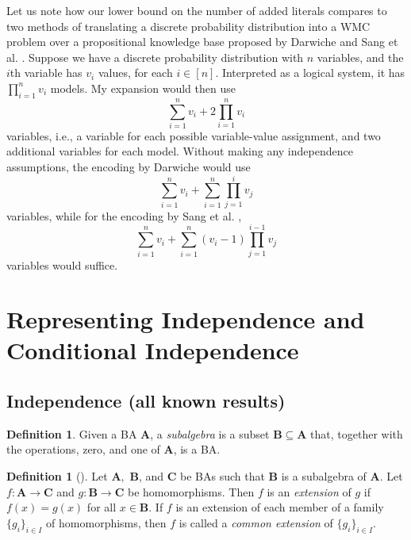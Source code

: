 \documentclass{article}
\theoremstyle{definition}
\newtheorem{definition}[theorem]{Definition}
\theoremstyle{remark}
\begin{document}

Let us note how our lower bound on the number of added literals compares to two
methods of translating a discrete probability distribution into a WMC problem
over a propositional knowledge base proposed by Darwiche
\cite{DBLP:conf/kr/Darwiche02} and Sang et al. \cite{DBLP:conf/aaai/SangBK05}.
Suppose we have a discrete probability distribution with  $n$ variables, and the
$i$th variable has $v_i$ values, for each $i \in [n]$. Interpreted as a logical
system, it has $\prod_{i=1}^n v_i$ models. My expansion would then use
\[
  \sum_{i=1}^n v_i + 2\prod_{i=1}^n v_i
\]
variables, i.e., a variable for each possible variable-value assignment, and two
additional variables for each model. Without making any independence
assumptions, the encoding by Darwiche \cite{DBLP:conf/kr/Darwiche02} would use
\[
  \sum_{i=1}^n v_i + \sum_{i=1}^n \prod_{j=1}^i v_j
\]
variables, while for the encoding by Sang et al. \cite{DBLP:conf/aaai/SangBK05},
\[
  \sum_{i=1}^n v_i + \sum_{i=1}^n (v_i - 1) \prod_{j=1}^{i-1} v_j
\]
variables would suffice.


\section{Representing Independence and Conditional Independence}

\subsection{Independence (all known results)}

\begin{definition}
  Given a BA $\mathbf{A}$, a \emph{subalgebra} is a subset $\mathbf{B} \subseteq
  \mathbf{A}$ that, together with the operations, zero, and one of $\mathbf{A}$,
  is a BA.
\end{definition}

\begin{definition}[\cite{givant2008introduction}]
  Let $\mathbf{A},$ $\mathbf{B}$, and $\mathbf{C}$ be BAs such that $\mathbf{B}$
  is a subalgebra of $\mathbf{A}$. Let $f\colon \mathbf{A} \to \mathbf{C}$ and
  $g\colon \mathbf{B} \to \mathbf{C}$ be homomorphisms. Then $f$ is an
  \emph{extension} of $g$ if $f(x) = g(x)$ for all $x \in \mathbf{B}$. If $f$ is
  an extension of each member of a family $\{ g_i \}_{i \in I}$ of
  homomorphisms, then $f$ is called a \emph{common extension} of $\{ g_i \}_{i
    \in I}$.
\end{definition}
\end{document}
